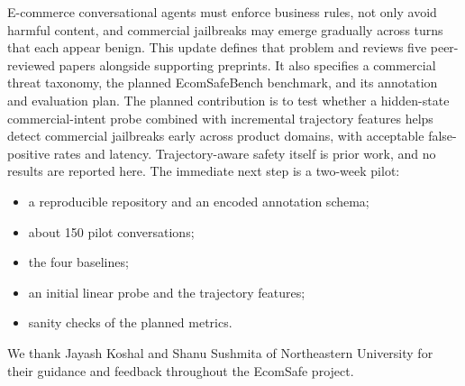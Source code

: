 \documentclass[sigconf,nonacm]{acmart}
\begin{document}
E-commerce conversational agents must enforce business rules, not only avoid harmful content, and commercial jailbreaks may emerge gradually across turns that each appear benign. This update defines that problem and reviews five peer-reviewed papers alongside supporting preprints. It also specifies a commercial threat taxonomy, the planned EcomSafeBench benchmark, and its annotation and evaluation plan. The planned contribution is to test whether a hidden-state commercial-intent probe combined with incremental trajectory features helps detect commercial jailbreaks early across product domains, with acceptable false-positive rates and latency. Trajectory-aware safety itself is prior work, and no results are reported here. The immediate next step is a two-week pilot:
\begin{itemize}
  \item a reproducible repository and an encoded annotation schema;
  \item about 150 pilot conversations;
  \item the four baselines;
  \item an initial linear probe and the trajectory features;
  \item sanity checks of the planned metrics.
\end{itemize}

\begin{acks}
We thank Jayash Koshal and Shanu Sushmita of Northeastern University
for their guidance and feedback throughout the EcomSafe project.
\end{acks}



\end{document}
